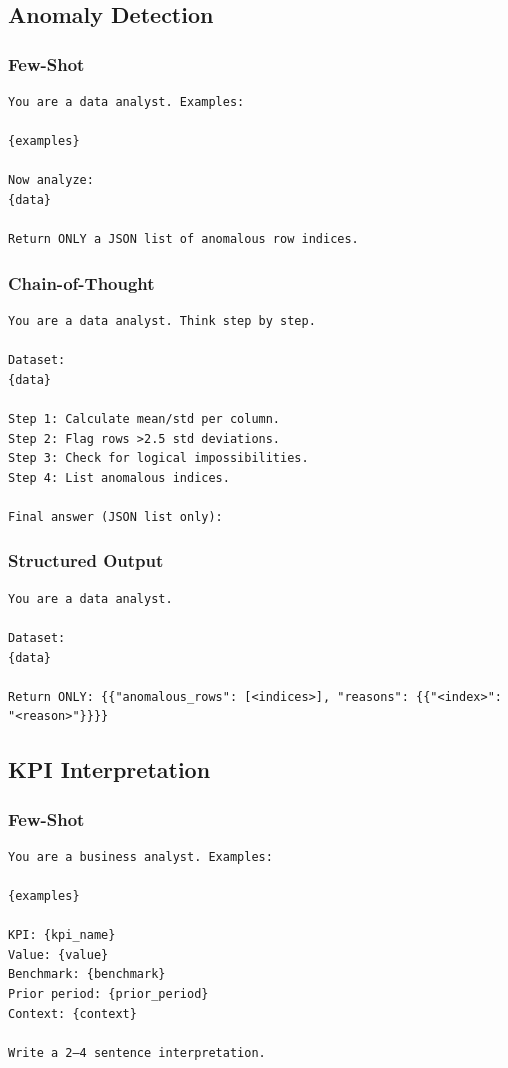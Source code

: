 \subsection{Anomaly Detection}
\subsubsection{Few-Shot}
\begin{verbatim}
You are a data analyst. Examples:

{examples}

Now analyze:
{data}

Return ONLY a JSON list of anomalous row indices.
\end{verbatim}

\subsubsection{Chain-of-Thought}
\begin{verbatim}
You are a data analyst. Think step by step.

Dataset:
{data}

Step 1: Calculate mean/std per column.
Step 2: Flag rows >2.5 std deviations.
Step 3: Check for logical impossibilities.
Step 4: List anomalous indices.

Final answer (JSON list only):
\end{verbatim}

\subsubsection{Structured Output}
\begin{verbatim}
You are a data analyst.

Dataset:
{data}

Return ONLY: {{"anomalous_rows": [<indices>], "reasons": {{"<index>": "<reason>"}}}}
\end{verbatim}

\subsection{KPI Interpretation}
\subsubsection{Few-Shot}
\begin{verbatim}
You are a business analyst. Examples:

{examples}

KPI: {kpi_name}
Value: {value}
Benchmark: {benchmark}
Prior period: {prior_period}
Context: {context}

Write a 2–4 sentence interpretation.
\end{verbatim}

